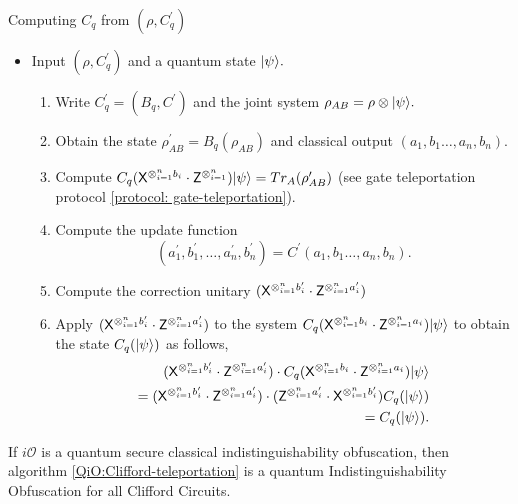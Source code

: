 \begin{algorithm}[H]
\label{Eval:Clifford-teleportation}
\caption{Computing $C_q$ from $\left(\rho,C_q^\prime \right)$}
 \begin{itemize}
  \item Input $\left(\rho,C_q^\prime \right)$ and a quantum state ${\lvert}\psi\rangle.$
  \begin{enumerate}
  \item   Write $C_q^\prime=(B_q, C^\prime)$ and the joint system $\rho_{AB}=\rho \otimes {\lvert}\psi\rangle.$
  \item   Obtain the state $\rho_{AB}^\prime=B_q(\rho_{AB})$ and classical output $(a_1,b_1\ldots,a_n,b_n).$
  \item   Compute $C_q({\sf X}^{\otimes_{i=1}^{n} b_{i}} \cdot {\sf Z}^{\otimes_{i=1}^{n}}){\lvert}\psi\rangle=Tr_A(\rho_{AB}^\prime)$ (see  gate teleportation protocol \ref{protocol: gate-teleportation}).
  \item   Compute the update function $$(a_1^\prime, b_1^\prime,\ldots, a_n^\prime, b_n^\prime)=C^\prime(a_1,b_1\ldots,a_n,b_n).$$
  \item    Compute the correction unitary $({\sf X}^{\otimes_{i=1}^{n} b_{i}^\prime} \cdot {\sf Z}^{\otimes_{i=1}^{n} a_{i}^\prime})$
  \item   Apply  $({\sf X}^{\otimes_{i=1}^{n} b_{i}^\prime} \cdot {\sf Z}^{\otimes_{i=1}^{n} a_{i}^\prime})$ to the system $C_q({\sf X}^{\otimes_{i=1}^{n} b_{i}} \cdot {\sf Z}^{\otimes_{i=1}^{n} a_{i}}){\lvert}\psi\rangle$ to obtain the state $C_q({\lvert}\psi\rangle)$ as follows,
  \begin{equation*}
  \begin{aligned}
 ({\sf X}^{\otimes_{i=1}^{n} b_{i}^\prime} \cdot {\sf Z}^{\otimes_{i=1}^{n} a_{i}^\prime}) \cdot C_q({\sf X}^{\otimes_{i=1}^{n} b_{i}} \cdot {\sf Z}^{\otimes_{i=1}^{n}a_{i}}){\lvert}\psi\rangle\\
 =({\sf X}^{\otimes_{i=1}^{n} b_{i}^\prime} \cdot {\sf Z}^{\otimes_{i=1}^{n} a_{i}^\prime}) \cdot ({\sf Z}^{\otimes_{i=1}^{n} a_{i}^\prime} \cdot {\sf X}^{\otimes_{i=1}^{n}b_{i}^\prime})C_q({\lvert}\psi\rangle)\\
 = C_q({\lvert}\psi\rangle).
 \end{aligned}
 \end{equation*}
  \end{enumerate}
  \end{itemize}
\end{algorithm}

\begin{theorem}
If $i\mathcal{O}$ is a quantum secure classical indistinguishability obfuscation, then algorithm \ref{QiO:Clifford-teleportation} is a quantum Indistinguishability Obfuscation for all Clifford Circuits.
\end{theorem}

